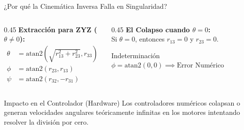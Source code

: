 \documentclass[aspectratio=169]{beamer}
\begin{document}
\begin{frame}{¿Por qué la Cinemática Inversa Falla en Singularidad?}
    \begin{columns}
        \begin{column}{0.45\textwidth}
            \textbf{Extracción para ZYZ ($\theta \neq 0$):}
            \begin{align*}
                \theta &= \text{atan2}\left(\sqrt{r_{13}^2 + r_{23}^2}, r_{33}\right) \\
                \phi &= \text{atan2}(r_{23}, r_{13}) \\
                \psi &= \text{atan2}(r_{32}, -r_{31})
            \end{align*}
        \end{column}
        \vrule{}
        \begin{column}{0.45\textwidth}
            \textbf{El Colapso cuando $\theta = 0$:} \\
            Si $\theta=0$, entonces $r_{13} = 0$ y $r_{23} = 0$.
            \vspace{0.2cm}
            \begin{alertblock}{Indeterminación}
                $\phi = \text{atan2}(0, 0) \implies \text{Error Numérico}$
            \end{alertblock}
        \end{column}
    \end{columns}
    
    \vspace{0.6cm}
    \begin{block}{Impacto en el Controlador (Hardware)}
        Los controladores numéricos colapsan o generan velocidades angulares teóricamente infinitas en los motores intentando resolver la división por cero.
    \end{block}
\end{frame}
\end{document}
